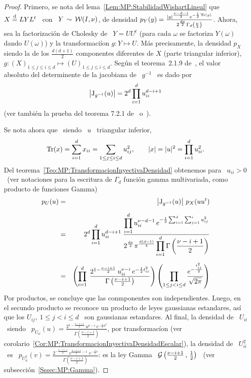 \begin{proof}
  Primero, se nota del lema~\ref{Lem:MP:StabilidadWishartLineal} que \ $X \stackrel{\mathrm{d}}{=}
  L  Y  L^t$  \  con  \  $Y  \, \sim  \,  \mathcal{W}(I,\nu)$,  de  densidad  $p_Y(y)  =
  \frac{|y|^{\frac{\nu-d-1}{2}}    e^{-\frac12    \operatorname{Tr}(y)}}{2^{\frac{d   \nu}{2}}
    \Gamma_d\left(  \frac{\nu}{2} \right)}$.  Ahora, sea  la  factorizaci\'on de
  Cholesky de  \ $Y =  U U^t$ (\ie  para cada $\omega$ se  factoriza $Y(\omega)$
  dando  $U(\omega)$)   y  la  transformaci\'ion   $g:  Y  \mapsto   U$.   M\'as
  precisamente,  la  densidad  $p_X$   siendo  la  de  los  $\frac{d  (d+1)}{2}$
  componentes diferentes  de $X$ (parte  triangular inferior), $g: (X)_{1  \le j
    \le i \le d} \mapsto (U)_{1 \le  j \le i \le d}$.
  Seg\'un el  teorema~2.1.9 de~\cite{Mui82}, el valor  absoluto del determinente
  de la jacobiana de \ $g^{-1}$ \ es dado por
  \[
  \left| \operatorname{J}_{g^{-1}}(u) \right| = 2^d \prod_{i=1}^d u_{ii}^{d-i+1}
  \]
  (ver tambi\'en la prueba del teorema 7.2.1 de~\cite{And03} o~\cite[Prop.~2.22]{BilBre99}).
  
  Se nota ahora que \ siendo \ $u$ \ triangular inferior,
  \[
  \operatorname{Tr}(x) =  \sum_{i=1}^d x_{ii}  = \sum_{1 \le j \le i \le d} u_{ij}^2, \qquad
  |x| = |u|^2 = \prod_{i=1}^d u_{ii}^2.
  \]
  Del  teorema~\ref{Teo:MP:TransformacionInyectivaDensidad}   obtenemos  para  \
  $u_{ii}  > 0$ \  (ver notaciones  para la  escritura de  $\Gamma_d$ funci\'on
  gamma multivariada, como producto de funciones Gamma)
  \begin{eqnarray*}
  p_U(u) & = &\left| \operatorname{J}_{g^{-1}}(u) \right| \,  p_X(u u^t) \\[2mm]
  & = & 2^d \prod_{i=1}^d u_{ii}^{d-i+1} \: \frac{\displaystyle \prod_{i=1}^d
  u_{ii}^{\nu-d-1} \, e^{ -\frac12 \sum_{i=1}^d \sum_{j=1}^i  u_{ij}^2}}{\displaystyle
  2^{\frac{d \nu}{2}} \pi^{\frac{d (d-1)}{4}} \prod_{i=1}^d \Gamma\left(
  \frac{\nu-i+1}{2} \right)}\\[2mm]
  & = & \left( \prod_{i=1}^d \: \frac{2^{1 - \frac{\nu-i+1}{2}} \,
  u_{ii}^{\nu-i} \, e^{-\frac12 t_{ii}^2}}{\Gamma\left( \frac{\nu-i+1}{2} \right)}
  \right) \left( \prod_{1 \le j < i \le d} \frac{\displaystyle
  e^{-\frac{t_{ij}^2}{2}}}{\sqrt{2 \pi}} \right)
  \end{eqnarray*}
  Por productos, se concluye que  las conmponentes son independientes. Luego, en
  el secundo  producto se  reconoce un producto  de leyes  gaussianas estandares,
  as\'i que los  $U_{ij}, \: 1 \le j  < i \le d$ \ son  gaussianas estandares. Al
  final,   la   densidad  de   \   $U_{ii}$   \   siendo  \   $p_{U_{ii}}(u)   =
  \frac{2^{1-\frac{\nu-i+1}{2}}  \, u^{\nu-i} \,  e^{-\frac12 u^2}}{\Gamma\left(
      \frac{\nu-i+1}{2}      \right)}$,      por      transformac\'ion      (ver
  corolario~\ref{Cor:MP:TransformacionInyectivaDensidadEscalar}), la densidad de
  \  $U_{ii}^2$  \  es  \  $p_{U_{ii}^2}(v)  =  \frac{2^{-\frac{\nu-i+1}{2}}  \,
    v^{\frac{\nu-i+1}{2}-1} \, \, e^{-\frac12 v}}{\Gamma\left( \frac{\nu-i+1}{2}
    \right)}$: es  la ley  Gamma \ $\mathcal{G}\left(  \frac{\nu-i+1}{2} \, ,  \, \frac12
  \right)$ \ (ver subsecci\'on~\ref{Sssec:MP:Gamma}).
\end{proof}
